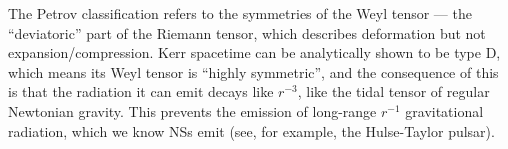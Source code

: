 \documentclass[main.tex]{subfiles}
\begin{document}
The Petrov classification refers to the symmetries of the Weyl tensor --- the ``deviatoric'' part of the Riemann tensor, which describes deformation but not expansion/compression. 
Kerr spacetime can be analytically shown to be type D, which means its Weyl tensor is ``highly symmetric'', and the consequence of this is that the radiation it can emit decays like \(r^{-3}\), like the tidal tensor of regular Newtonian gravity. 
This prevents the emission of long-range \(r^{-1}\) gravitational radiation, which we know NSs emit (see, for example, the Hulse-Taylor pulsar). 






\end{document}
